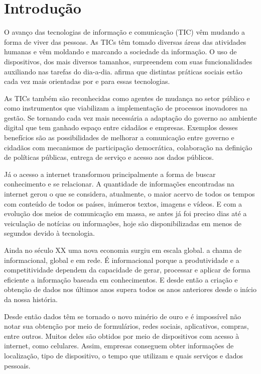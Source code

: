 \chapter{Introdução}

O avanço das tecnologias de informação e comunicação (TIC) vêm mudando a forma de viver das pessoas. As TICs têm tomado diversas áreas das atividades humanas \cite{monereo2010} e vêm moldando e marcando a sociedade da informação. O uso de dispositivos, dos mais diversos tamanhos, surpreendem com suas funcionalidades auxiliando nas tarefas do dia-a-dia. \cite{martins2005} afirma que distintas práticas sociais estão cada vez mais orientadas por e para essas tecnologias.

As TICs também são reconhecidas como agentes de mudança no setor público e como instrumentos que viabilizam a implementação de processos inovadores na gestão. Se tornando cada vez mais necessária a adaptação do governo ao ambiente digital que tem ganhado espaço entre cidadãos e empresas. Exemplos desses benefícios são as possibilidades de melhorar a comunicação entre governo e cidadãos com mecanismos de participação democrática, colaboração na definição de políticas públicas, entrega de serviço e acesso aos dados públicos. \cite{tic2015}

Já o acesso a internet transformou principalmente a forma de buscar conhecimento e se relacionar. A quantidade de informações encontradas na internet gerou o que se considera, atualmente, o maior acervo de todos os tempos com conteúdo de todos os países, inúmeros textos, imagens e vídeos. E com a evolução dos meios de comunicação em massa, se antes já foi preciso dias até a veiculação de notícias ou informações, hoje são disponibilizadas em menos de segundos devido à tecnologia.

Ainda no século XX uma nova economia surgiu em escala global.  a chama de informacional, global e em rede. É informacional porque a produtividade e a competitividade dependem da capacidade de gerar, processar e aplicar de forma eficiente a informação baseada em conhecimentos. E desde então a criação e obtenção de dados nos últimos anos supera todos os anos anteriores desde o início da nossa história.

Desde então dados têm se tornado o novo minério de ouro e é impossível não notar sua obtenção por meio de formulários, redes sociais, aplicativos, compras, entre outros.  Muitos deles são obtidos por meio de dispositivos com acesso à internet, como celulares. Assim, empresas conseguem obter informações de localização, tipo de dispositivo, o tempo que utilizam e quais serviços e dados pessoais.

